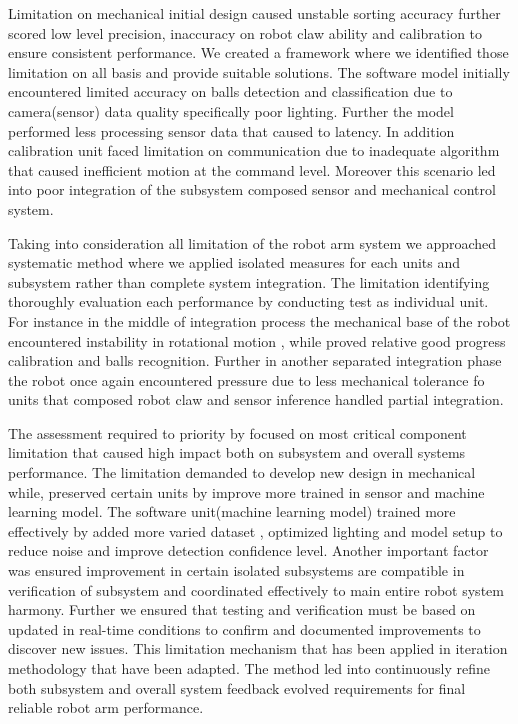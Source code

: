  Limitation on mechanical initial design caused unstable sorting accuracy further scored low level precision, inaccuracy on robot claw ability and calibration to ensure consistent performance. We created a framework where we identified those limitation on all basis and provide suitable solutions. The software model initially encountered limited accuracy on balls detection and classification due to camera(sensor) data quality specifically poor lighting. Further the model performed less processing sensor data that caused to latency. In addition calibration unit faced limitation on communication due to inadequate algorithm that caused inefficient motion at the command level. Moreover this scenario led into poor integration of the subsystem composed sensor and mechanical control system.
 

Taking into consideration all limitation of the robot arm system we approached systematic method where we applied isolated measures for each units and subsystem rather than complete system integration. The limitation identifying thoroughly evaluation each performance by conducting test as individual unit. For instance in the middle of integration process the mechanical base of the robot encountered instability in rotational motion , while proved relative good progress calibration and balls recognition. Further in another separated integration phase the robot once again encountered pressure due to less mechanical tolerance fo units that composed robot claw and sensor inference handled partial integration. 




The assessment required to priority  by focused on most critical component limitation that caused high impact both on subsystem and overall systems performance. The limitation demanded to develop new design in mechanical while, preserved certain units by improve more trained in sensor and machine learning model. The software unit(machine learning model) trained more effectively by added more varied dataset , optimized lighting and model setup to reduce noise and improve detection confidence level. Another important factor was ensured improvement in certain isolated subsystems are compatible in verification of subsystem and coordinated effectively to main entire robot system harmony. Further we ensured that testing and verification must be based on updated in real-time conditions to confirm and documented improvements to discover new issues. This limitation mechanism that has been applied in iteration methodology that have been adapted. The method led into continuously refine both subsystem and overall system feedback evolved requirements for final reliable robot arm performance. 





